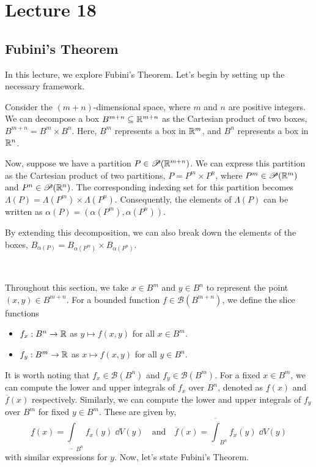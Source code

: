 \documentclass[../Analysis-3.tex]{subfiles}
\begin{document}
\chapter*{Lecture 18} %
\setcounter{chapter}{18} %
\setcounter{section}{0}
\setcounter{equation}{0}
\setcounter{figure}{0}


\section{Fubini's Theorem}

In this lecture, we explore Fubini's Theorem. Let's begin by setting up the necessary framework.

\ssk

Consider the $(m+n)$-dimensional space, where $m$ and $n$ are positive integers. We can decompose a box $B^{m+n} \subseteq \mathbb{R}^{m+n}$ as the Cartesian product of two boxes, $B^{m+n} = B^m \times B^n$. Here, $B^m$ represents a box in $\mathbb{R}^m$, and $B^n$ represents a box in $\mathbb{R}^n$.

\ssk

Now, suppose we have a partition $P \in \mathscr{P}(\mathbb{R}^{m+n})$. We can express this partition as the Cartesian product of two partitions, $P = P^m \times P^n$, where $P^m \in \mathscr{P}(\mathbb{R}^m)$ and $P^n \in \mathscr{P}(\mathbb{R}^n)$. The corresponding indexing set for this partition becomes $\Lambda(P) = \Lambda(P^m) \times \Lambda(P^n)$. Consequently, the elements of $\Lambda(P)$ can be written as $\alpha(P) = (\alpha(P^m), \alpha(P^n))$.

\ssk

By extending this decomposition, we can also break down the elements of the boxes, $B_{\alpha(P)} = B_{\alpha(P^m)} \times B_{\alpha(P^n)}$.

\

Throughout this section, we take $x \in B^m$ and $y \in B^n$ to represent the point $(x,y) \in B^{m+n}$. For a bounded function $f \in \mathscr{B}(B^{m+n})$, we define the slice functions
\begin{itemize}
  \item $f_x: B^n \to \mathbb{R}$ as $ y \mapsto f(x,y) $ for all $ x \in B^m $.
  \item $f_y: B^m \to \mathbb{R}$ as $ x \mapsto f(x,y) $ for all $ y \in B^n $.
\end{itemize}

It is worth noting that $f_x \in \mathscr{B}(B^n)$ and $f_y \in \mathscr{B}(B^m)$. For a fixed $x \in B^m$, we can compute the lower and upper integrals of $f_x$ over $B^n$, denoted as $\underline{f}(x)$ and $\overline{f}(x)$ respectively. Similarly, we can compute the lower and upper integrals of $f_y$ over $B^m$ for fixed $y \in B^m$. These are given by,
\[  \underline{f}(x) = \underline{\int}_{B^n} f_x(y) \; \dd{V(y)} \quad \text{and} \quad \overline{f}(x) = \overline{\int}_{B^n} f_x(y) \; \dd{V(y)}  \]
with similar expressions for $y$. Now, let's state Fubini's Theorem.
\end{document}
